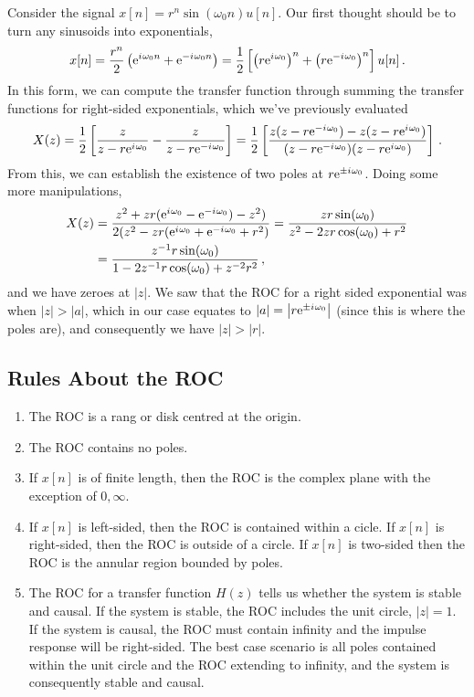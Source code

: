 \begin{exmp}
  Consider the signal $x[n] = r^n\sin(\omega_0 n)u[n]$. Our first thought should be
  to turn any sinusoids into exponentials,
  \begin{displaymath}
    x[n] = \frac{r^n}{2}\left(\mathrm{e}^{{i\mkern1mu} \omega_0n} + \mathrm{e}^{-{i\mkern1mu} \omega_0n}\right) = \frac{1}{2}\left[
      \left(r\mathrm{e}^{{i\mkern1mu}\omega_0}\right)^n + \left(r\mathrm{e}^{-{i\mkern1mu}\omega_0}\right)^n 
    \right] u[n] \,.
  \end{displaymath}
  In this form, we can compute the transfer function through summing
  the transfer functions for right-sided exponentials, which we've previously
  evaluated
  \begin{displaymath}
    X(z) = \frac{1}{2}\left[\frac{z}{z - r\mathrm{e}^{{i\mkern1mu}\omega_0}} - \frac{z}{z - r\mathrm{e}^{-{i\mkern1mu}\omega_0}}\right]
    = \frac{1}{2}\left[\frac{z(z-r\mathrm{e}^{-{i\mkern1mu}\omega_0}) - z(z - r\mathrm{e}^{{i\mkern1mu}\omega_0})}{(z-r\mathrm{e}^{-{i\mkern1mu}\omega_0})(z-r\mathrm{e}^{{i\mkern1mu}\omega_0})}\right] \,.
  \end{displaymath}
  From this, we can establish the existence of two poles at $r\mathrm{e}^{\pm{i\mkern1mu}\omega_0}$.
  Doing some more manipulations,
  \begin{align*}
    X(z) &= \frac{
      z^2 + zr(\mathrm{e}^{{i\mkern1mu}\omega_0} - \mathrm{e}^{-{i\mkern1mu}\omega_0}) - z^2)
    }{
      2(z^2 - zr(\mathrm{e}^{{i\mkern1mu}\omega_0} + \mathrm{e}^{-{i\mkern1mu}\omega_0} + r^2)
    }
    = \frac{zr\sin(\omega_0)}{z^2 - 2zr\cos(\omega_0) + r^2} \\
    &=  \frac{z^{-1}r\sin(\omega_0)}{1 - 2z^{-1}r\cos(\omega_0) + z^{-2}r^2}\,,
  \end{align*}
  and we have zeroes at $|z|$. We saw that the ROC for a right
  sided exponential was when $|z| > |a|$, which in our case equates to
  $|a| = \left|r\mathrm{e}^{\pm {i\mkern1mu}\omega_0}\right|$ (since this is where the poles are),
  and consequently we have $|z| > |r|$.
\end{exmp}

\subsection{Rules About the ROC}
%
\begin{enumerate}
\item The ROC is a rang or disk centred at the origin.
\item The ROC contains no poles.
\item If $x[n]$ is of finite length, then the ROC is the complex
  plane with the exception of $0,\infty$.
\item If $x[n]$ is left-sided, then the ROC is contained within a cicle.
  If $x[n]$ is right-sided, then the ROC is outside of a circle. If $x[n]$
  is two-sided then the ROC is the annular region bounded by poles.
\item The ROC for a transfer function $H(z)$ tells us whether the system
  is stable and causal. If the system is stable, the ROC includes the unit
  circle, $|z| = 1$. If the system is causal, the ROC must contain infinity and
  the impulse response will be right-sided. The best case scenario is all poles
  contained within the unit circle and the ROC extending to infinity, and the
  system is consequently stable and causal.
\end{enumerate}
